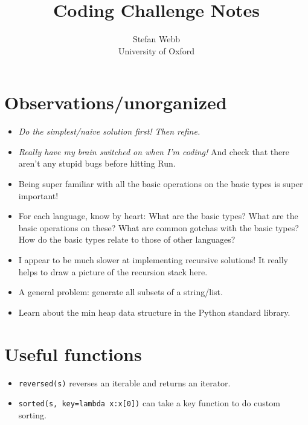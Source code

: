\documentclass[12pt]{article}
\title{Coding Challenge Notes}
\author{
  Stefan Webb \\
  University of Oxford \\
}
\begin{document}
\lstset{language=Python,xleftmargin=12pt,basicstyle=\ttfamily\footnotesize,aboveskip=-6pt, belowskip=0pt,tabsize=2,breaklines=true}
\newcommand{\python}[1]{\lstinline[columns=fixed]{#1}}

\suppressfloats

\setlength{\abovedisplayskip}{3.5pt}
\setlength{\belowdisplayskip}{3.5pt}
\setlength{\abovedisplayshortskip}{3.5pt}
\setlength{\belowdisplayshortskip}{3.5pt}	

\maketitle

%  

\section{Observations/unorganized}
\begin{itemize}
  \item \emph{Do the simplest/naive solution first! Then refine.}
  \item \emph{Really have my brain switched on when I'm coding!} And check that there aren't any stupid bugs before hitting Run.
  \item Being super familiar with all the basic operations on the basic types is super important!
  \item For each language, know by heart: What are the basic types? What are the basic operations on these? What are common gotchas with the basic types? How do the basic types relate to those of other languages?
  \item I appear to be much slower at implementing recursive solutions! It really helps to draw a picture of the recursion stack here.
  \item A general problem: generate all subsets of a string/list.
  \item Learn about the min heap data structure in the Python standard library.
\end{itemize}

\section{Useful functions}
\begin{itemize}
  \item \python{reversed(s)} reverses an iterable and returns an iterator.
  \item \python{sorted(s, key=lambda x:x[0])} can take a key function to do custom sorting.
\end{itemize}
\end{document}
